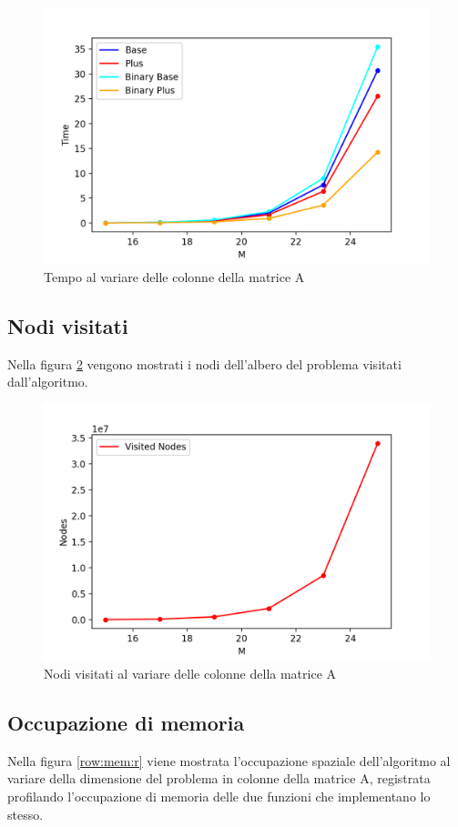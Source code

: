 \begin{figure}[h!]
\centering
\includegraphics[width=0.8\linewidth]{figures/random/binary_time.png}
\caption{Tempo al variare delle colonne della matrice A}
\label{m:time}
\end{figure}

\newpage
\subsection{Nodi visitati}
Nella figura \ref{m:nodes} vengono mostrati i nodi dell'albero del problema visitati dall'algoritmo.

\begin{figure}[h!]
\centering
\includegraphics[width=0.8\linewidth]{figures/random/r_col_nodes.png}
\caption{Nodi visitati al variare delle colonne della matrice A}
\label{m:nodes}
\end{figure}

\newpage

\subsection{Occupazione di memoria}
Nella figura \ref{row:mem:r} viene mostrata l'occupazione spaziale dell'algoritmo al variare della dimensione del problema in colonne della matrice A, registrata profilando l'occupazione di memoria delle due funzioni che implementano lo stesso.

